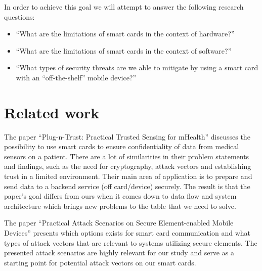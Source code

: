 In order to achieve this goal we will attempt to answer the following research questions:
\begin{itemize}
  \item ``What are the limitations of smart cards in the context of hardware?''
  \item ``What are the limitations of smart cards in the context of software?''
  \item ``What types of security threats are we able to mitigate by using a smart card with an ``off-the-shelf'' mobile device?''
\end{itemize}



\section{Related work}
The paper ``Plug-n-Trust: Practical Trusted Sensing for mHealth'' \cite{plugntrust} discusses the possibility to use smart cards to ensure confidentiality of data from medical sensors on a patient. There are a lot of similarities in their problem statements and findings, such as the need for cryptography, attack vectors and establishing trust in a limited environment. Their main area of application is to prepare and send data to a backend service (off card/device) securely. The result is that the paper's goal differs from ours when it comes down to data flow and system architecture which brings new problems to the table that we need to solve.

The paper ``Practical Attack Scenarios on Secure Element-enabled Mobile Devices'' \cite{practicalAttacksSE} presents which options exists for smart card communication and what types of attack vectors that are relevant to systems utilizing secure elements. The presented attack scenarios are highly relevant for our study and serve as a starting point for potential attack vectors on our smart cards.

